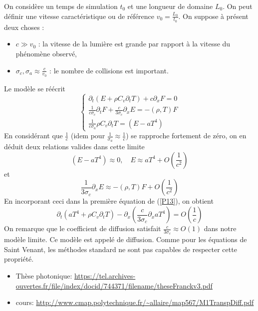 \documentclass[11pt]{article}
\theoremstyle{definition}
\begin{document}
On considère un temps de simulation $t_0$ et une longueur de domaine $L_0$. On peut définir une vitesse caractéristique ou de référence $v_0 = \frac{L_0}{t_0}$. On suppose à présent deux choses :
\begin{itemize}
\item $c \gg v_0$ : la vitesse de la lumière est grande par rapport à la vitesse du phénomène observé,
\item $\sigma_c, \sigma_a \approx \frac{c}{v_0}$ : le nombre de collisions est important.
\end{itemize}
  Le modèle se réécrit
\begin{equation}\label{P13}
\left\{\begin{array}{l}
\displaystyle \partial_t (E + \rho C_v \partial_t T) + c\partial_x F = 0 \\
\displaystyle \frac{1}{c \sigma_c}\partial_t F + \frac{c}{3\sigma_c}\partial_x E = - (\rho,T)F\\
\displaystyle \frac{1}{c \sigma_a}\rho C_v \partial_t T = (E-aT^4)
\end{array}\right.
\end{equation}
En considérant que $\frac{1}{c}$ (idem pour $\frac{1}{\sigma_a}\approx \frac{1}{c}$) se rapproche fortement de zéro, on en déduit deux relations valides dans cette limite
$$
(E-aT^4)\approx 0, \quad E \approx a T^{4} + O\left(\frac{1}{c^2}\right)
$$
et
$$
\frac{1}{3\sigma_c}\partial_x E \approx -(\rho,T)F + O\left(\frac{1}{c^2}\right)
$$
En incorporant ceci dans la première équation de (\ref{P13}), on obtient 
\begin{equation}\label{limit}
 \partial_t (a T^4 + \rho C_v \partial_t T) - \partial_x \left(\frac{c}{3\sigma_c}\partial_x a T^4 \right) = O\left(\frac{1}{c}\right)
\end{equation}
On remarque que le coefficient de diffusion satisfait $\frac{c}{3\sigma_c}\approx O(1)$ dans notre modèle limite. Ce modèle est appelé  de diffusion. Comme pour les équations de Saint Venant, les méthodes standard ne sont pas capables de respecter cette  propriété.


\begin{itemize}
\item Thèse photonique: \url{https://tel.archives-ouvertes.fr/file/index/docid/744371/filename/theseFranckv3.pdf}
\item cours: \url{http://www.cmap.polytechnique.fr/~allaire/map567/M1TranspDiff.pdf}
\end{itemize}
\end{document}

